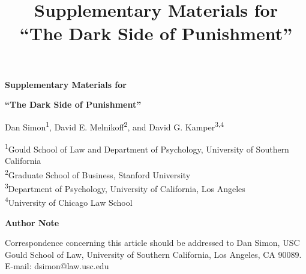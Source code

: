 \documentclass[man,12pt,natbib,floatsintext,nolmodern]{apa7}
\title{Supplementary Materials for\\``The Dark Side of Punishment''}
\begin{document}

\begin{titlepage}
\thispagestyle{empty}
\vspace*{1in}
\begin{center}
{\large\bfseries Supplementary Materials for\par}
\vspace{0.5em}
{\large\bfseries ``The Dark Side of Punishment''\par}

\vspace{2em}

Dan Simon\textsuperscript{1}, David E. Melnikoff\textsuperscript{2}, and David G. Kamper\textsuperscript{3,4}

\vspace{0.75em}

\textsuperscript{1}Gould School of Law and Department of Psychology, University of Southern California\\[0.25em]
\textsuperscript{2}Graduate School of Business, Stanford University\\[0.25em]
\textsuperscript{3}Department of Psychology, University of California, Los Angeles\\[0.25em]
\textsuperscript{4}University of Chicago Law School
\end{center}

\vfill

\begin{center}\textbf{Author Note}\end{center}
\noindent Correspondence concerning this article should be addressed to Dan Simon, USC Gould School of Law, University of Southern California, Los Angeles, CA 90089. E-mail: dsimon@law.usc.edu

\vspace{0.5in}
\end{titlepage}

\renewcommand{\thesection}{S\arabic{section}}
\renewcommand{\thetable}{S\arabic{table}}
\renewcommand{\thefigure}{S\arabic{figure}}
\setcounter{section}{0}
\setcounter{table}{0}
\setcounter{figure}{0}




\end{document}
